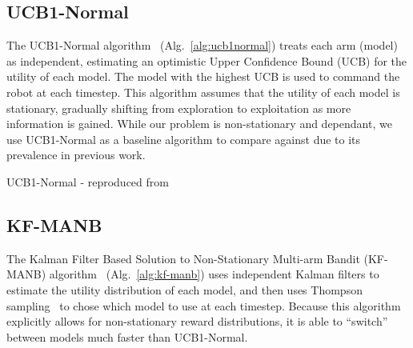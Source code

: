 \subsection{UCB1-Normal}
The UCB1-Normal algorithm~\cite{Auer2002} (Alg.~\ref{alg:ucb1normal}) treats each arm (model) as independent, estimating an optimistic Upper Confidence Bound (UCB) for the utility of each model. The model with the highest UCB is used to command the robot at each timestep. This algorithm assumes that the utility of each model is stationary, gradually shifting from exploration to exploitation as more information is gained. While our problem is non-stationary and dependant, we use UCB1-Normal as a baseline algorithm to compare against due to its prevalence in previous work.

\begin{algorithm}[h]
    \caption{UCB1-Normal - reproduced from~\cite{Auer2002}}
    \label{alg:ucb1normal}
    \begin{algorithmic}
            \vspace{-11pt}
        \EndFor
    \end{algorithmic}
\end{algorithm}


\subsection{KF-MANB}
The Kalman Filter Based Solution to Non-Stationary Multi-arm Bandit (KF-MANB) algorithm~\cite{Granmo2010} (Alg.~\ref{alg:kf-manb}) uses independent Kalman filters to estimate the utility distribution of each model, and then uses Thompson sampling~\cite{Agrawal2012} to chose which model to use at each timestep. Because this algorithm explicitly allows for non-stationary reward distributions, it is able to ``switch'' between models much faster than UCB1-Normal.

